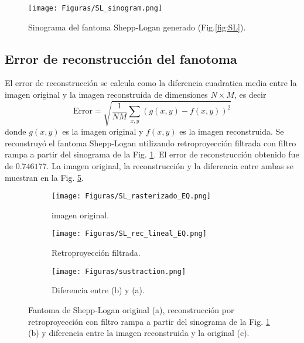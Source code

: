 \documentclass[letterpaper,12pt]{article}
\theoremstyle{plain}
\begin{document}
\begin{figure}[H]
   \centering
         \texttt{[image: Figuras/SL\_sinogram.png]}
   \caption{Sinograma del fantoma Shepp-Logan generado (Fig.\ref{fig:SL}).}
   \label{fig:SL_sinogram}
\end{figure}

\subsection{Error de reconstrucción del fanotoma}

El error de reconstrucción se calcula como la diferencia cuadratica media entre la imagen original y la imagen reconstruida de dimensiones $N\times M$, es decir
\begin{equation}
      \text{Error} = \sqrt{\frac{1}{NM}\sum_{x,y}(g(x,y) - f(x,y))^2}
\end{equation}
donde $g(x,y)$ es la imagen original y $f(x,y)$ es la imagen reconstruida. Se reconstruyó el fantoma Shepp-Logan utilizando retroproyección filtrada con filtro rampa a partir del sinograma de la Fig. \ref{fig:SL_sinogram}. El error de reconstrucción obtenido fue de $0.746177$. La imagen original, la reconstrucción y la diferencia entre ambas se muestran en la Fig. \ref{fig:sustraction}.

\begin{figure}[H]
   \centering
        \begin{subfigure}[h]{0.32\linewidth}
           \centering
           \texttt{[image: Figuras/SL\_rasterizado\_EQ.png]}
           \caption{imagen original.} 
           \label{fig:original}
        \end{subfigure}
        \begin{subfigure}[h]{0.32\linewidth}
           \centering
           \texttt{[image: Figuras/SL\_rec\_lineal\_EQ.png]}
           \caption{Retroproyección filtrada.}
           \label{fig:reconstruccion}
        \end{subfigure}
        \begin{subfigure}[h]{0.32\linewidth}
         \centering
         \texttt{[image: Figuras/sustraction.png]}
         \caption{Diferencia entre (b) y (a).}
         \label{fig:resta}
      \end{subfigure}
   \caption{Fantoma de Shepp-Logan original (a), reconstrucción por retroproyección con filtro rampa a partir del sinograma de la Fig. \ref{fig:SL_sinogram} (b) y diferencia entre la imagen reconstruida y la original (c).}
   \label{fig:sustraction}
\end{figure}
\end{document}
